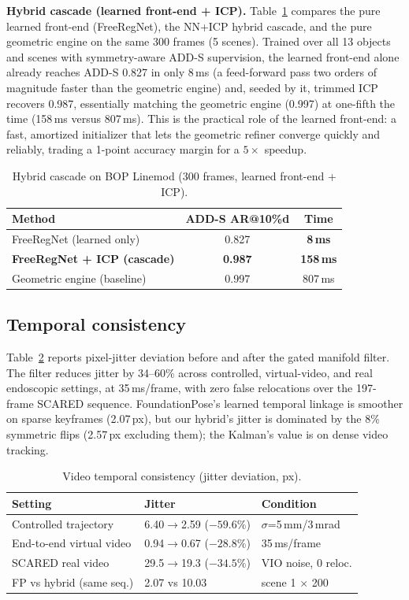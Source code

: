 \documentclass[9pt,twoside,web]{ieeecolor2}
\begin{document}
\textbf{Hybrid cascade (learned front-end + ICP).} Table~\ref{tab:cascade} compares the pure learned front-end (FreeRegNet), the NN+ICP hybrid cascade, and the pure geometric engine on the same 300 frames (5 scenes). Trained over all 13 objects and scenes with symmetry-aware ADD-S supervision, the learned front-end alone already reaches ADD-S 0.827 in only 8\,ms (a feed-forward pass two orders of magnitude faster than the geometric engine) and, seeded by it, trimmed ICP recovers 0.987, essentially matching the geometric engine (0.997) at one-fifth the time (158\,ms versus 807\,ms). This is the practical role of the learned front-end: a fast, amortized initializer that lets the geometric refiner converge quickly and reliably, trading a 1-point accuracy margin for a $5\times$ speedup.

\begin{table}[t]
\centering
\caption{Hybrid cascade on BOP Linemod (300 frames, learned front-end + ICP).}
\label{tab:cascade}
\begin{tabular}{lcc}
\toprule
Method & ADD-S AR@10\%d & Time \\
\midrule
FreeRegNet (learned only) & 0.827 & \textbf{8\,ms} \\
\textbf{FreeRegNet + ICP (cascade)} & \textbf{0.987} & \textbf{158\,ms} \\
Geometric engine (baseline) & 0.997 & 807\,ms \\
\bottomrule
\end{tabular}
\end{table}

\subsection{Temporal consistency}
Table~\ref{tab:temporal} reports pixel-jitter deviation before and after the gated manifold filter. The filter reduces jitter by 34--60\% across controlled, virtual-video, and real endoscopic settings, at 35\,ms/frame, with zero false relocations over the 197-frame SCARED sequence. FoundationPose's learned temporal linkage is smoother on sparse keyframes (2.07\,px), but our hybrid's jitter is dominated by the 8\% symmetric flips (2.57\,px excluding them); the Kalman's value is on dense video tracking.

\begin{table}[t]
\centering
\caption{Video temporal consistency (jitter deviation, px).}
\label{tab:temporal}
\begin{tabular}{lll}
\toprule
Setting & Jitter & Condition \\
\midrule
Controlled trajectory & 6.40$\to$2.59 ($-59.6\%$) & $\sigma$=5\,mm/3\,mrad \\
End-to-end virtual video & 0.94$\to$0.67 ($-28.8\%$) & 35\,ms/frame \\
SCARED real video & 29.5$\to$19.3 ($-34.5\%$) & VIO noise, 0 reloc. \\
FP vs hybrid (same seq.) & 2.07 vs 10.03 & scene 1 $\times$ 200 \\
\bottomrule
\end{tabular}
\end{table}
\end{document}

